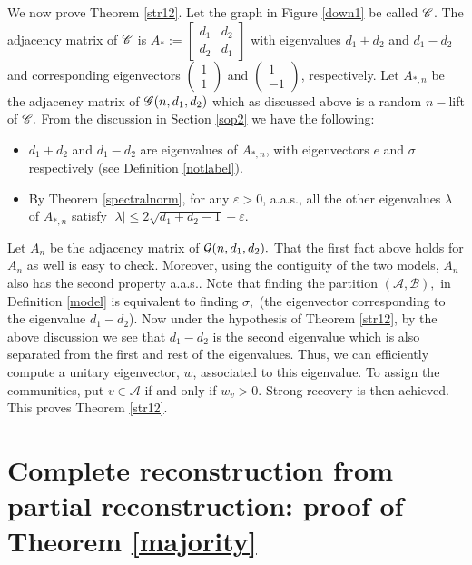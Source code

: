 \documentclass[11pt,reqno]{amsart}
\newcommand{\e}{\varepsilon}
\begin{document}
We now prove Theorem \ref{str12}. Let the graph in Figure \ref{down1} be called $\mathscr{C}$. The adjacency matrix of $\mathscr{C}$ is $A_*:=\left[\begin{array}{cc}d_1 & d_2\\
d_2 & d_1 
\end{array}
\right]$ with eigenvalues $d_1+d_2$ and $d_1-d_2$ and corresponding eigenvectors $\left(\begin{array}{c}1\\
1 
\end{array}
\right)$ and $\left(\begin{array}{c}1\\
-1 
\end{array}
\right)$,
respectively. Let $A_{*,n}$ be the adjacency matrix of $\mathscr{G}(n,d_1,d_2)$ which as discussed above is a random $n-$lift of $\mathscr{C}.$ From the discussion in Section \ref{sop2} we have the following: 
\begin{itemize}
\item $d_1+d_2$ and $d_1-d_2$  are eigenvalues of $A_{*,n}$, with eigenvectors $e$ and $\sigma$ respectively (see Definition \ref{notlabel}). 
\item By Theorem \ref{spectralnorm}, for any $\e>0$, a.a.s., all the other eigenvalues $\lambda$ of $A_{*,n}$ satisfy $|\lambda|\le 2\sqrt{d_1+d_2-1}+ \e.$
\end{itemize}
Let $A_{n}$ be the adjacency matrix of $\mathcal{G}(n,d_1,d_2).$ That the
first fact above holds for $A_n$ as well is easy to check. Moreover,
using the contiguity of the two models, $A_{n}$ also has the second
property a.a.s..
Note that  finding the partition $(\mathcal{A},\mathcal{B}),$ in  Definition \ref{model} is equivalent to finding $\sigma,$ (the eigenvector corresponding to the eigenvalue $d_1-d_2$). Now under the hypothesis of Theorem \ref{str12}, by the above discussion we see that $d_1-d_2$ is the second eigenvalue which is also separated from the first and rest of the eigenvalues. 
Thus, we can efficiently compute a unitary eigenvector, $w$, associated to this eigenvalue. To assign the communities, put $v\in \mathcal{A}$ if and only if $w_v>0$. Strong recovery is then achieved. This proves Theorem \ref{str12}.

\section{Complete reconstruction from partial reconstruction: proof of Theorem \ref{majority}} \label{algorithm}
\end{document}
